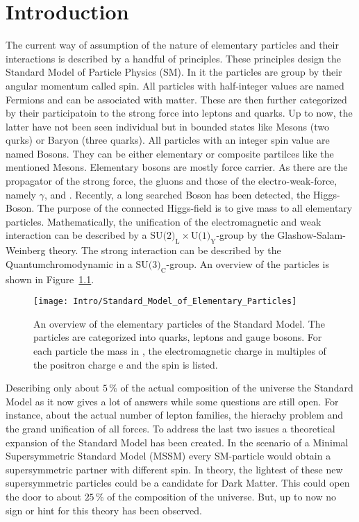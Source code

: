 \chapter{Introduction \label{sec:Intro}}

The current way of assumption of the nature of elementary particles and their interactions is described by a handful of principles. These principles design the Standard Model of Particle Physics (SM). In it the particles are group by their angular momentum called spin. All particles with half-integer values are named Fermions and can be associated with matter. These are then further categorized by their participatoin to the strong force into leptons and quarks. Up to now, the latter have not been seen individual but in bounded states like Mesons (two qurks) or Baryon (three quarks). All particles with an integer spin value are named Bosons. They can be either elementary or composite partilces like the mentioned Mesons. Elementary bosons are mostly force carrier. As there are the propagator of the strong force, the gluons and those of the electro-weak-force, namely $\gamma{}$, \Zz{} and \Wpm{}. Recently, a long searched Boson has been detected, the Higgs-Boson. The purpose of the connected Higgs-field is to give mass to all elementary particles. Mathematically, the unification of the electromagnetic and weak interaction can be described by a $\textrm{SU(2)}_{\textrm{L}} \times \textrm{U(1)}_{\textrm{Y}}$-group by the Glashow-Salam-Weinberg theory. The strong interaction can be described by the Quantumchromodynamic in a $\textrm{SU(3)}_{\textrm{C}}$-group. An overview of the particles is shown in Figure~\ref{plot:IntroParticles}.

\begin{figure}[!htb]
  \centering
  \texttt{[image: Intro/Standard\_Model\_of\_Elementary\_Particles]}
  \caption[Overview over the elementary particles]{An overview of the elementary particles of the Standard Model. The particles are categorized into quarks, leptons and gauge bosons. For each particle the mass in \MeVcc, the electromagnetic charge in multiples of the positron charge e and the spin is listed. \label{plot:IntroParticles} }
\end{figure}

Describing only about $5\,\%$ of the actual composition of the universe the Standard Model as it now gives a lot of answers while some questions are still open. For instance, about the actual number of lepton families, the hierachy problem and the grand unification of all forces. To address the last two issues a theoretical expansion of the Standard Model has been created. In the scenario of a Minimal Supersymmetric Standard Model (MSSM) every SM-particle would obtain a supersymmetric partner with different spin. In theory, the lightest of these new supersymmetric particles could be a candidate for Dark Matter. This could open the door to about $25\,\%$ of the composition of the universe. But, up to now no sign or hint for this theory has been observed. \\

